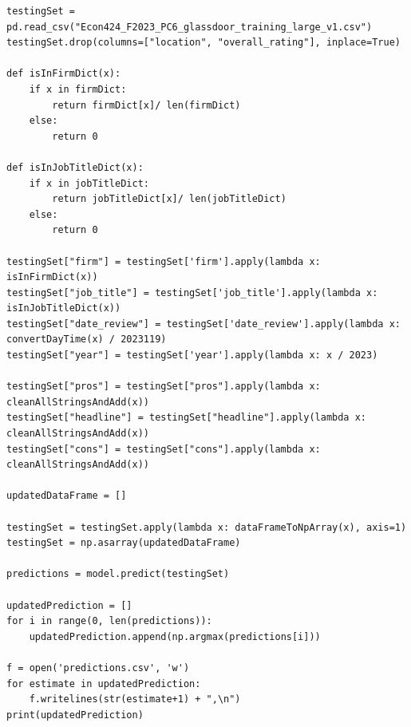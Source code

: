 \documentclass{article}
\begin{document}
\begin{lstlisting}
testingSet = pd.read_csv("Econ424_F2023_PC6_glassdoor_training_large_v1.csv")
testingSet.drop(columns=["location", "overall_rating"], inplace=True)

def isInFirmDict(x):
    if x in firmDict:
        return firmDict[x]/ len(firmDict)
    else:
        return 0

def isInJobTitleDict(x):
    if x in jobTitleDict:
        return jobTitleDict[x]/ len(jobTitleDict)
    else:
        return 0

testingSet["firm"] = testingSet['firm'].apply(lambda x: isInFirmDict(x))
testingSet["job_title"] = testingSet['job_title'].apply(lambda x: isInJobTitleDict(x))
testingSet["date_review"] = testingSet['date_review'].apply(lambda x: convertDayTime(x) / 2023119)
testingSet["year"] = testingSet['year'].apply(lambda x: x / 2023)

testingSet["pros"] = testingSet["pros"].apply(lambda x: cleanAllStringsAndAdd(x))
testingSet["headline"] = testingSet["headline"].apply(lambda x: cleanAllStringsAndAdd(x))
testingSet["cons"] = testingSet["cons"].apply(lambda x: cleanAllStringsAndAdd(x))

updatedDataFrame = []

testingSet = testingSet.apply(lambda x: dataFrameToNpArray(x), axis=1)
testingSet = np.asarray(updatedDataFrame)

predictions = model.predict(testingSet)

updatedPrediction = []
for i in range(0, len(predictions)):
    updatedPrediction.append(np.argmax(predictions[i]))

f = open('predictions.csv', 'w')
for estimate in updatedPrediction:
    f.writelines(str(estimate+1) + ",\n")
print(updatedPrediction)

\end{lstlisting}
\end{document}
